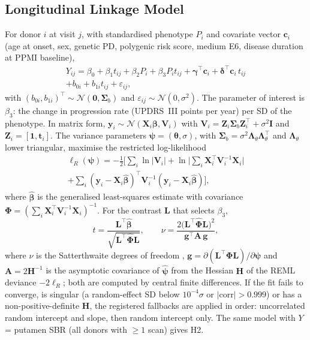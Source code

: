 \subsection{Longitudinal Linkage Model}\label{sec:lmm}
For donor $i$ at visit $j$, with standardised phenotype $P_i$ and covariate vector $\mathbf{c}_i$
(age at onset, sex, genetic PD, polygenic risk score, medium E6, disease duration at PPMI baseline),
\begin{multline}
Y_{ij} = \beta_0 + \beta_1 t_{ij} + \beta_2 P_i + \beta_3 P_i t_{ij}
+ \boldsymbol{\gamma}^\top\mathbf{c}_i + \boldsymbol{\delta}^\top\mathbf{c}_i\, t_{ij}\\
+ b_{0i} + b_{1i} t_{ij} + \varepsilon_{ij},
\label{eq:lmm}
\end{multline}
with $(b_{0i}, b_{1i})^\top \sim \mathcal{N}(\mathbf{0}, \boldsymbol{\Sigma}_b)$ and
$\varepsilon_{ij} \sim \mathcal{N}(0, \sigma^2)$. The parameter of interest is $\beta_3$: the change
in progression rate (UPDRS~III points per year) per SD of the phenotype. In matrix form,
$\mathbf{y}_i \sim \mathcal{N}(\mathbf{X}_i\boldsymbol{\beta}, \mathbf{V}_i)$ with
$\mathbf{V}_i = \mathbf{Z}_i\boldsymbol{\Sigma}_b\mathbf{Z}_i^\top + \sigma^2\mathbf{I}$ and
$\mathbf{Z}_i = [\mathbf{1}, \mathbf{t}_i]$. The variance parameters
$\boldsymbol{\psi} = (\boldsymbol{\theta}, \sigma)$, with
$\boldsymbol{\Sigma}_b = \sigma^2\boldsymbol{\Lambda}_\theta\boldsymbol{\Lambda}_\theta^\top$ and
$\boldsymbol{\Lambda}_\theta$ lower triangular, maximise the restricted log-likelihood
\begin{multline}
\ell_R(\boldsymbol{\psi}) = -\tfrac{1}{2}\Big[\sum_i \ln|\mathbf{V}_i|
+ \ln\Big|\sum_i \mathbf{X}_i^\top\mathbf{V}_i^{-1}\mathbf{X}_i\Big|\\
+ \sum_i (\mathbf{y}_i - \mathbf{X}_i\hat{\boldsymbol\beta})^\top\mathbf{V}_i^{-1}(\mathbf{y}_i - \mathbf{X}_i\hat{\boldsymbol\beta})\Big],
\label{eq:reml}
\end{multline}
where $\hat{\boldsymbol\beta}$ is the generalised least-squares estimate with covariance
$\boldsymbol{\Phi} = (\sum_i \mathbf{X}_i^\top\mathbf{V}_i^{-1}\mathbf{X}_i)^{-1}$. For the contrast
$\mathbf{L}$ that selects $\beta_3$,
\begin{equation}
t = \frac{\mathbf{L}^\top\hat{\boldsymbol\beta}}{\sqrt{\mathbf{L}^\top\hat{\boldsymbol\Phi}\mathbf{L}}},
\qquad
\nu = \frac{2\big(\mathbf{L}^\top\hat{\boldsymbol\Phi}\mathbf{L}\big)^2}
{\mathbf{g}^\top\mathbf{A}\,\mathbf{g}},
\label{eq:satt}
\end{equation}
where $\nu$ is the Satterthwaite degrees of freedom \cite{satterthwaite1946},
$\mathbf{g} = \partial(\mathbf{L}^\top\boldsymbol\Phi\mathbf{L})/\partial\boldsymbol\psi$ and
$\mathbf{A} = 2\mathbf{H}^{-1}$ is the asymptotic covariance of $\hat{\boldsymbol\psi}$ from the
Hessian $\mathbf{H}$ of the REML deviance $-2\ell_R$; both are computed by central finite
differences. If the fit fails to converge, is singular (a random-effect SD below $10^{-4}\sigma$
or $|\mathrm{corr}| > 0.999$) or has a non-positive-definite $\mathbf{H}$, the registered fallbacks
are applied in order: uncorrelated random intercept and slope, then random intercept only. The
same model with $Y$ = putamen SBR (all donors with $\ge 1$ scan) gives H2.


